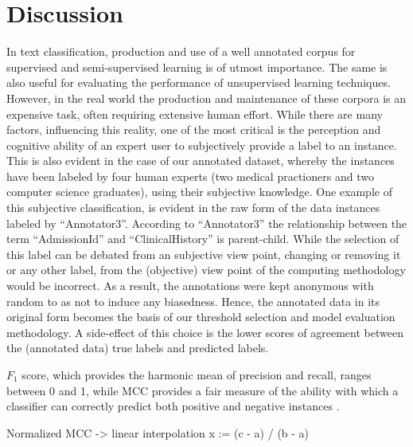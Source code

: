 \documentclass{ieeeaccess}
\begin{document}
\section{Discussion}
In text classification, production and use of a well annotated corpus for supervised and semi-supervised learning is of utmost importance. The same is also useful for evaluating the performance of unsupervised learning techniques. However, in the real world the production and maintenance of these corpora is an expensive task, often requiring extensive human effort. While there are many factors, influencing this reality, one of the most critical is the perception and cognitive ability of an expert user to subjectively provide a label to an instance. This is also evident in the case of our annotated dataset, whereby the instances have been labeled by four human experts (two medical practioners and two computer science graduates), using their subjective knowledge. One example of this subjective classification, is evident in the raw form of the data instances labeled by ``Annotator3''. According to ``Annotator3'' the relationship between the term ``AdmissionId'' and ``ClinicalHistory'' is parent-child. While the selection of this label can be debated from an subjective view point, changing or removing it or any other label, from the (objective) view point of the computing methodology would be incorrect. As a result, the annotations were kept anonymous with random to as not to induce any biasedness. Hence, the annotated data in its original form becomes the basis of our threshold selection and model evaluation methodology. A side-effect of this choice is the lower scores of agreement between the (annotated data) true labels and predicted labels.

$F_1$ score, which provides the harmonic mean of precision and recall, ranges between 0 and 1, while MCC provides a fair measure of the ability with which a classifier can correctly predict both positive and negative instances \cite{chicco2020advantages}. 

Normalized MCC -> linear interpolation
x := (c - a) / (b - a)
\end{document}
